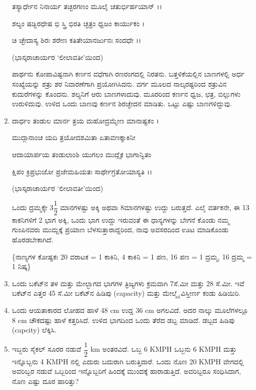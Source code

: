\begin{enumerate}
ತಸ್ಯಾರ್ಧೇನ ನಿನಾರ್ಯ ತಚ್ಛರಗಣಂ ಮೂಲೈ ಚತುರ್ಭಿರ್ಹಯಾನ್ ।।

ಶಲ್ಯಂ ಷಡ್ಭಿರಧೇಷ ಭಿ ಸ್ತ್ರಿ ಭಿರತಿ ಚ್ಛತ್ರಂ ಧ್ವಜಂ ಕಾರ್ಯುಕಂ ।

ಚಿ ಚ್ಛೇದಾಸ್ಯ ಶಿರಃ ಶರೇಣ ಕತಿತೇಯಾನರ್ಜುನಃ ಸಂದಧೇ ।।

\hfill (ಭಾಸ್ಕರಾಚಾರ್ಯರ `ಲೀಲಾವತೀ'ಯಿಂದ)


ಪಾರ್ಥನು ಕೋಪಾವಿಷ್ಟನಾಗಿ ಕರ್ಣನ ವಧೆಗಾಗಿ ರಣರಂಗದಲ್ಲಿ ನಿರತನು. ಬತ್ತಳಿಕೆಯಲ್ಲಿನ ಬಾಣಗಳಲ್ಲಿ ಅರ್ಧ ಸಂಖ್ಯೆಯನ್ನು ಶತ್ರು ಶರ ನಿವಾರಣೆಗಾಗಿ ಪ್ರಯೋಗಿಸಿದನು. ವರ್ಗ ಮೂಲದ ನಾಲ್ಕರಷ್ಟರಿಂದ ಶತ್ರುವಿನ ಕುದುರೆಗಳನ್ನು ಕೊಂದನು. ಶಲ್ಯನಿಗೆ ಆರು ಬಾಣಗಳಾದುವು. ಮೂರರಿಂದ ಕರ್ಣನ ಧ್ವಜ, ಛತ್ರ, ಬಿಲ್ಲುಗಳು ಉರುಳಿದುವು. ಉಳಿದ ಒಂದು ಬಾಣವು ಕರ್ಣನ ಶಿರಚ್ಛೇದನ ಮಾಡಿತು. ಒಟ್ಟು ಎಷ್ಟು ಬಾಣಗಳಿದ್ದುವು. 

\item ದಾರ್ಧಂ ತಂಡುಲ ಮಾರ್ನ ತ್ರಯ ಮಹೋದ್ರಮ್ಮೇಣ ಮಾನಾಷ್ಟಕಂ ।

ಮುದ್ಗಾನಾಂಚ ಯದಿ ತ್ರಯೋದಶಮಿತಾ ಏತಾವಣಕ್ಕಾಕಿನೀ 

ಆದಾಯಾರ್ಪಯ ತಂಡುಲಾಂಶಿ ಯುಗಲಂ ಮುದ್ಗೈಕ ಭಾಗಾನ್ವಿತಂ 

ಕ್ಷಿಪಂ ಕ್ರಿಪ್ರಭುಜೋ ಪ್ರಜೇಮಹಿಯತಃ ಸಾರ್ಥೇಗ್ರತೋಯಾಸ್ಯತಿ ।।
\begin{flushright}
(ಭಾಸ್ಕರಾಚಾರ್ಯರ `ಲೀಲಾವತೀ'ಯಿಂದ)
\end{flushright}

ಒಂದು ದ್ರಮ್ಮಕ್ಕೇ $3\dfrac{1}{2}$ ಮಾನಗಳಷ್ಟು ಅಕ್ಕಿ ಅಥವಾ 8ಮಾನಗಳಷ್ಟು ಉದ್ದು ಬರುತ್ತದೆ. ಎಲೈ ವರ್ತಕನೇ, ಈ 13 ಕಾಕನಿಗಳಿಗೆ 2 ಭಾಗ ಅಕ್ಕಿ, ಒಂದು ಭಾಗ ಉದ್ದು ಇರುವಂತೆ ಈ ಧಾನ್ಯಗಳನ್ನು ಬೇಗನೆ ಕೊಂಡು ನಮ್ಮ ಗುಂಪಿನವರು ಮುಮ್ದಕ್ಕೆ ಪ್ರಯಾಣ ಬೆಳಸುತ್ತಾರಾದ್ದರಿಂದ, ನಾವು ಅವಸರದಿಂದ ಊಟ ಮಾಡಿಕೊಂಡು ಹೊರಡಬೇಕಾಗಿದೆ. 

\{ನಾಣ್ಯಗಳ ಕೋಷ್ಟಕಃ 20 ವರಾಟಕ = 1 ಕಾಕಿನಿ, 4 ಕಾಕಿನಿ  = 1 ಪಣ, 16 ಪಣ = 1 ದ್ರಮ್ಮ, 16 ದ್ರಮ್ಮ  = 1 ನಿಷ್ಕ\}  

\item ಒಂದು ಬಕೆಟ್‌ನ ತಳ ಮತ್ತು ಮೇಲ್ಭಾಗದ ಭಾಗಗಳ ತ್ರಿಜ್ಯಗಳು ಕ್ರಮವಾಗಿ 7ಸೆ.ಮೀ ಮತ್ತು 28 ಸೆ.ಮೀ. ಇವೆ ಬಕೆಟ್‌ನ ಎತ್ತರ 45 ಸೆ.ಮೀ ಬಕೆಟ್‌ನ ಹಿಡಿಪು (capacity) ಮತ್ತು ಮೇಲ್ಮೈ ವಿಸ್ತೀರ್ಣ ಕಂಡು ಹಿಡಿಯಿರಿ. 

\item ಒಂದು ಆಯತಾಕಾರದ ಲೋಹದ ಹಾಳೆ 48 cm ಉದ್ದ 36 cm ಅಗಲವಿದೆ. ಅದರ ನಾಲ್ಕು ಮೂಲೆಗಳಲ್ಲೂ 8 cm ಚೌಕದಷ್ಟು ಹಾಳೆ ಕತ್ತರಿಸಿದೆ. ಉಳಿದ ಭಾಗದಿಂದ ಒಂದು ತೆರೆದ ಡಬ್ಬ ಮಾಡಿದೆ. ಡಬ್ಬದ ಹಿಡಿಪು (capcity) ಲೆಕ್ಕಿಸಿ. 

\item ಇಬ್ಬರು ಸೈಕಲ್ ಸೂರರ ನಡುವೆ $\dfrac{1}{2}$ km ಅಂತರವಿದೆ. ಒಬ್ಬ 6 KMPH ಒಬ್ಬನು 6 KMPH ಮತ್ತು ಇನ್ನೊಬ್ಬನು 4 KMPH ನಲ್ಲಿ ಎದುರು ಬದುರಾಗಿ ಬರುತ್ತಿದಾರೆ. ಒಂದು ನೊಣ 20 KMPH ವೇಗದಲ್ಲಿ ಅವರಿಬ್ಬರ ನಡುವೆ ಒಬ್ಬರಿಂದ ಇನ್ನೊಬ್ಬರಿಗೆ ಹಿಂದಕ್ಕೆ ಮುಂದಕ್ಕೆ ಹಾರಾಡುತ್ತಿದೆ. ಅವರಿಬ್ಬರೂ ಸಂಧಿಸಿದಾಗ, ನೊಣ ಎಷ್ಟು ದೂರ ಹಾರಿತ್ತು? 


\end{enumerate}

